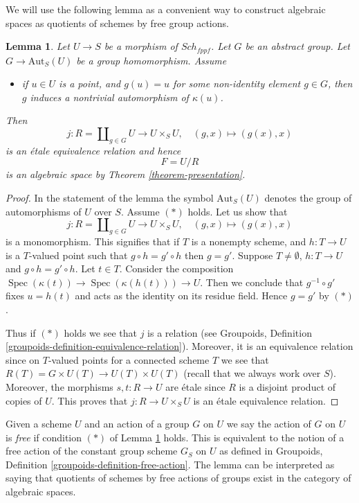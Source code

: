 \documentclass{stacks-project}
\theoremstyle{plain}
\newtheorem{lemma}[subsection]{Lemma}
\theoremstyle{definition}
\theoremstyle{remark}
\numberwithin{equation}{subsection}
\def\Spec{\mathop{\mathrm{Spec}}}
\def\Sch{\mathit{Sch}}
\begin{document}
\medskip\noindent
We will use the following lemma as a convenient way to construct
algebraic spaces as quotients of schemes by free group actions.

\begin{lemma}
\label{lemma-quotient}
Let $U \to S$ be a morphism of $\Sch_{fppf}$.
Let $G$ be an abstract group. Let $G \to \text{Aut}_S(U)$
be a group homomorphism. Assume
\begin{itemize}
\item[(*)] if $u \in U$ is a point, and $g(u) = u$
for some non-identity element $g \in G$, then $g$
induces a nontrivial automorphism of $\kappa(u)$.
\end{itemize}
Then
$$
j :
R = \coprod\nolimits_{g \in G} U
\longrightarrow
U \times_S U,
\quad
(g, x) \longmapsto (g(x), x)
$$
is an \'etale equivalence relation and hence
$$
F = U/R
$$
is an algebraic space by Theorem \ref{theorem-presentation}.
\end{lemma}

\begin{proof}
In the statement of the lemma the symbol $\text{Aut}_S(U)$ denotes
the group of automorphisms of $U$ over $S$.
Assume $(*)$ holds. Let us show that
$$
j :
R = \coprod\nolimits_{g \in G} U
\longrightarrow
U \times_S U,
\quad
(g, x) \longmapsto (g(x), x)
$$
is a monomorphism. This signifies that if $T$ is a nonempty
scheme, and $h : T \to U$ is a $T$-valued point such that
$g \circ h = g' \circ h$ then $g = g'$. Suppose
$T \not = \emptyset$, $h : T \to U$ and $g \circ h = g' \circ h$.
Let $t \in T$. Consider the composition
$\Spec(\kappa(t)) \to \Spec(\kappa(h(t))) \to U$.
Then we conclude that $g^{-1} \circ g'$ fixes $u = h(t)$ and
acts as the identity on its residue field. Hence $g = g'$ by $(*)$.

\medskip\noindent
Thus if $(*)$ holds we see that $j$ is a relation (see
Groupoids, Definition \ref{groupoids-definition-equivalence-relation}).
Moreover, it is an equivalence relation since on $T$-valued points
for a connected scheme $T$ we see that
$R(T) = G \times U(T) \to U(T) \times U(T)$ (recall that we always
work over $S$). Moreover, the morphisms $s, t : R \to U$ are \'etale
since $R$ is a disjoint product of copies of $U$.
This proves that $j : R \to U \times_S U$ is an \'etale equivalence relation.
\end{proof}

\noindent
Given a scheme $U$ and an action of a group $G$ on $U$ we say the action
of $G$ on $U$ is {\it free} if condition $(*)$ of Lemma \ref{lemma-quotient}
holds. This is equivalent to the notion of a free action of the constant
group scheme $G_S$ on $U$ as defined in
Groupoids, Definition \ref{groupoids-definition-free-action}.
The lemma can be interpreted as saying that quotients of schemes by
free actions of groups exist in the category of algebraic spaces.
\end{document}
